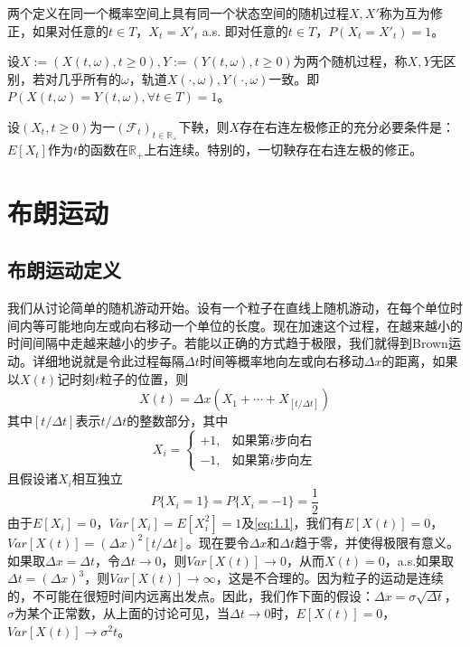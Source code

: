 \documentclass[lang=cn,10pt,thmcnt=section]{elegantbook}
\begin{document}
\begin{definition}
	两个定义在同一个概率空间上具有同一个状态空间的随机过程$X, X'$称为互为修正，如果对任意的$t \in T$，$X_t = X'_t$ a.s. 即对任意的$t \in T$，$P(X_t = X'_t) = 1$。
\end{definition}
\begin{definition}
	设$X := (X(t, \omega), t \geq 0), Y := (Y(t, \omega), t \geq 0)$为两个随机过程，称$X, Y$无区别，若对几乎所有的$\omega$，轨道$X(\cdot, \omega), Y(\cdot, \omega)$一致。即$P(X(t, \omega) = Y(t, \omega), \forall t \in T) = 1$。
\end{definition}
\begin{theorem}
	设$(X_t, t \geq 0)$为一$(\mathcal{F}_t)_{t \in \mathbb{R}_+}$下鞅，则$X$存在右连左极修正的充分必要条件是：$E[X_t]$作为$t$的函数在$\mathbb{R}_+$上右连续。特别的，一切鞅存在右连左极的修正。
\end{theorem}
\chapter{布朗运动}
\section{布朗运动定义}
我们从讨论简单的随机游动开始。设有一个粒子在直线上随机游动，在每个单位时间内等可能地向左或向右移动一个单位的长度。现在加速这个过程，在越来越小的时间间隔中走越来越小的步子。若能以正确的方式趋于极限，我们就得到Brown运动。详细地说就是令此过程每隔$\Delta t$时间等概率地向左或向右移动$\Delta x$的距离，如果以$X(t)$记时刻$t$粒子的位置，则
\begin{equation}\label{eq:1.1}
X(t) = \Delta x (X_1 + \cdots + X_{[t/\Delta t]})
\end{equation}
其中$[t/\Delta t]$表示$t/\Delta t$的整数部分，其中
\[
X_i = \begin{cases} 
+1, & \text{如果第$i$步向右} \\
-1, & \text{如果第$i$步向左}
\end{cases}
\]
且假设诸$X_i$相互独立
\[
P\{X_i = 1\} = P\{X_i = -1\} = \frac{1}{2}
\]
由于$E[X_i] = 0$，$Var[X_i] = E[X_i^2] = 1$及\ref{eq:1.1}，我们有$E[X(t)] = 0$，$Var[X(t)] = (\Delta x)^2[t/\Delta t]$。现在要令$\Delta x$和$\Delta t$趋于零，并使得极限有意义。如果取$\Delta x = \Delta t$，令$\Delta t \to 0$，则$Var[X(t)] \to 0$，从而$X(t) = 0$，a.s.如果取$\Delta t = (\Delta x)^3$，则$Var[X(t)] \to \infty$，这是不合理的。因为粒子的运动是连续的，不可能在很短时间内远离出发点。因此，我们作下面的假设：$\Delta x = \sigma \sqrt{\Delta t}$，$\sigma$为某个正常数，从上面的讨论可见，当$\Delta t \to 0$时，$E[X(t)] = 0$，$Var[X(t)] \to \sigma^2 t$。
\end{document}
